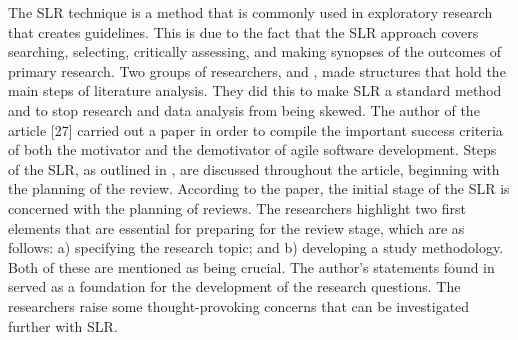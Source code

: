 \documentclass[conference]{IEEEtran}
\begin{document}
\begin{enumerate}
\newline
\newline
The SLR technique is a method that is commonly used in exploratory research that creates guidelines. This is due to the fact that the SLR approach covers searching, selecting, critically assessing, and making synopses of the outcomes of primary research. Two groups of researchers, \cite{scrump2} and \cite{al2020agile}, made structures that hold the main steps of literature analysis. They did this to make SLR a standard method and to stop research and data analysis from being skewed. The author of the article [27] carried out a paper in order to compile the important success criteria of both the motivator and the demotivator of agile software development.
\newline
\newline
Steps of the SLR, as outlined in \cite{scrump2}, are discussed throughout the article, beginning with the planning of the review. According to the paper, the initial stage of the SLR is concerned with the planning of reviews. The researchers highlight two first elements that are essential for preparing for the review stage, which are as follows: a) specifying the research topic; and b) developing a study methodology. Both of these are mentioned as being crucial. The author's statements found in \cite{scrump1} served as a foundation for the development of the research questions. The researchers raise some thought-provoking concerns that can be investigated further with SLR.


\end{enumerate}
\end{document}
